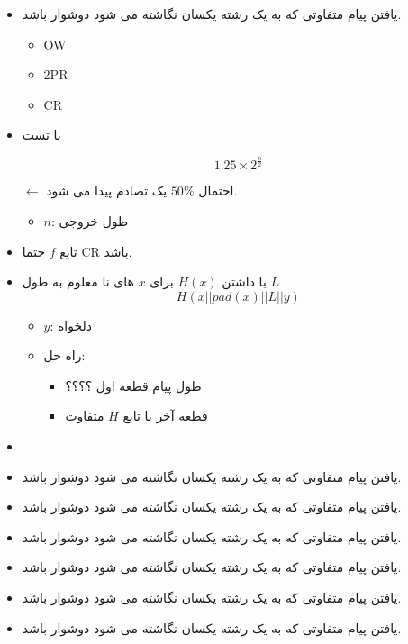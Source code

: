 \documentclass{report}
\begin{document}
\begin{itemize}
		\item 
یافتن پیام متفاوتی که به یک رشته یکسان نگاشته می شود دوشوار باشد.
			\begin{itemize}
				\item OW
				\item 2PR
				\item CR
			\end{itemize}
		\item 
با تست 

{ \large $$1.25\times2^{\frac{n}{2}}$$ }

$\leftarrow$
احتمال $50 \%$ یک تصادم پیدا می شود.
			\begin{itemize}
				\item $n$: 
				طول خروجی
			\end{itemize}
		\item 
			تابع $f$ حتما CR باشد.
		\item 
با داشتن $H(x)$ برای $x$ های نا معلوم به طول $L$
{\large $$H(x || pad(x) || L || y)$$}
			\begin{itemize}
				\item $y$:
				دلخواه
			\end{itemize}
			
			\begin{itemize}
				\item راه حل:
					\begin{itemize}
						\item
						 طول پیام قطعه اول ؟؟؟؟
						\item
						قطعه آخر با تابع $H$ متفاوت
					\end{itemize}
			\end{itemize}
	\item 

	\item 
یافتن پیام متفاوتی که به یک رشته یکسان نگاشته می شود دوشوار باشد.
	\item 
یافتن پیام متفاوتی که به یک رشته یکسان نگاشته می شود دوشوار باشد.
	\item 
یافتن پیام متفاوتی که به یک رشته یکسان نگاشته می شود دوشوار باشد.
	\item 
یافتن پیام متفاوتی که به یک رشته یکسان نگاشته می شود دوشوار باشد.
	\item 
یافتن پیام متفاوتی که به یک رشته یکسان نگاشته می شود دوشوار باشد.
	\item 
یافتن پیام متفاوتی که به یک رشته یکسان نگاشته می شود دوشوار باشد.
	\end{itemize}
\end{document}
